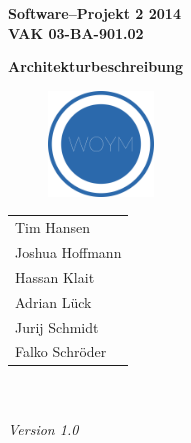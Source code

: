 \documentclass[fontsize=12pt,paper=a4,twoside]{scrartcl}
\begin{document}
  \thispagestyle{fancy}
  \fancyhead[LO,RE]{ }
  \fancyfoot[C]{}

  \vspace{3cm}

  \begin{minipage}[H]{\textwidth}
  \begin{center}
  \bf
  \Large
  Software--Projekt 2 2014\\
  \smallskip
  \small
  VAK 03-BA-901.02\\
  \vspace{3cm}
  \end{center}
  \end{minipage}
  \begin{minipage}[H]{\textwidth}
  \begin{center}
  \vspace{1cm}
  \bf
  \Large Architekturbeschreibung\\
  \vspace{3ex}
   	  \begin{figure}[H]
      \centering
      \includegraphics[width=0.25\textwidth]{../WOYM.png}
      \end{figure}
  \vfill
  \end{center}
  \end{minipage}
  \vfill
  \begin{minipage}[H]{\textwidth}
  \begin{center}
  \sf
  \begin{tabular}{l}
  Tim Hansen \\
  Joshua Hoffmann\\
  Hassan Klait \\
  Adrian Lück \\
  Jurij Schmidt\\
  Falko Schröder
  \end{tabular}
  \\ ~
  \vspace{2cm}
  \\
  \it Version 1.0\\ ~
  \end{center}
  \end{minipage}
\end{document}
